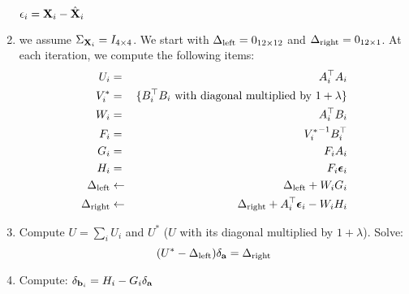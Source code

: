 \begin{enumerate}
$\mathbf{\epsilon}_i=\mathbf{X}_i-\hat{\mathbf{X}}_i$
 \item we assume $\Sigma_{\mathbf{X}_i}={I_{4 \times 4}}$. We start with $\Delta_\text{left}={0_{12 \times 12}}$ and $\Delta_\text{right}={0_{12 \times 1}}$. At each iteration, we compute the following items:
 \begin{eqnarray*}
  U_i &= & A_i^\top A_i \\
  V_i^* &= &\{B_i^\top B_i \text{ with diagonal multiplied by } 1+\lambda \}\\
  W_i &= &A_i^\top B_i \\
  F_i &= &{V_i^*}^{-1} B_i^\top \\
  G_i &= &F_i A_i \\
  H_i &= &F_i \bm{\epsilon}_i \\
  \Delta_\text{left} &\leftarrow &\Delta_\text{left} + W_i G_i \\
  \Delta_\text{right} &\leftarrow &\Delta_\text{right} + A_i^\top \bm{\epsilon}_i -W_i H_i
 \end{eqnarray*}
\item Compute $U=\sum_i U_i$ and $U^*$ ($U$ with its diagonal multiplied by  $1+\lambda$). Solve: $$( U^* - \Delta_\text{left} ) \delta_{\mathbf{a}} =\Delta_\text{right}$$

\item Compute: $\delta_{\mathbf{b}_i}=H_i-G_i \delta_{\mathbf{a}}$
\end{enumerate}

